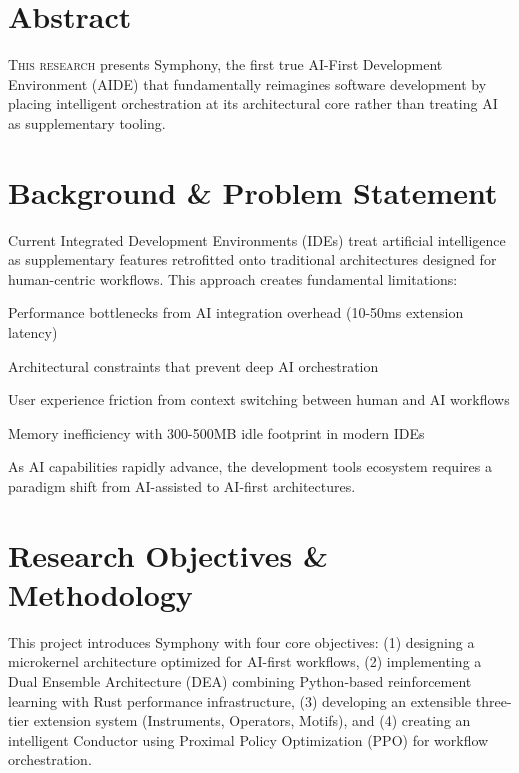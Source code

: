
\section*{Abstract}

\lettrine{T}{his research} presents Symphony, the first true AI-First Development Environment (AIDE) that fundamentally reimagines software development by placing intelligent orchestration at its architectural core rather than treating AI as supplementary tooling.

\section*{Background \& Problem Statement}

Current Integrated Development Environments (IDEs) treat artificial intelligence as supplementary features retrofitted onto traditional architectures designed for human-centric workflows. This approach creates fundamental limitations:

\begin{compactlist}
    \item Performance bottlenecks from AI integration overhead (10-50ms extension latency)
    \item Architectural constraints that prevent deep AI orchestration  
    \item User experience friction from context switching between human and AI workflows
    \item Memory inefficiency with 300-500MB idle footprint in modern IDEs
\end{compactlist}

As AI capabilities rapidly advance, the development tools ecosystem requires a paradigm shift from AI-assisted to AI-first architectures.

\section*{Research Objectives \& Methodology}

\begin{infobox}[title=Primary Research Objectives]
This project introduces Symphony with four core objectives: (1) designing a microkernel architecture optimized for AI-first workflows, (2) implementing a Dual Ensemble Architecture (DEA) combining Python-based reinforcement learning with Rust performance infrastructure, (3) developing an extensible three-tier extension system (Instruments, Operators, Motifs), and (4) creating an intelligent Conductor using Proximal Policy Optimization (PPO) for workflow orchestration.
\end{infobox}

